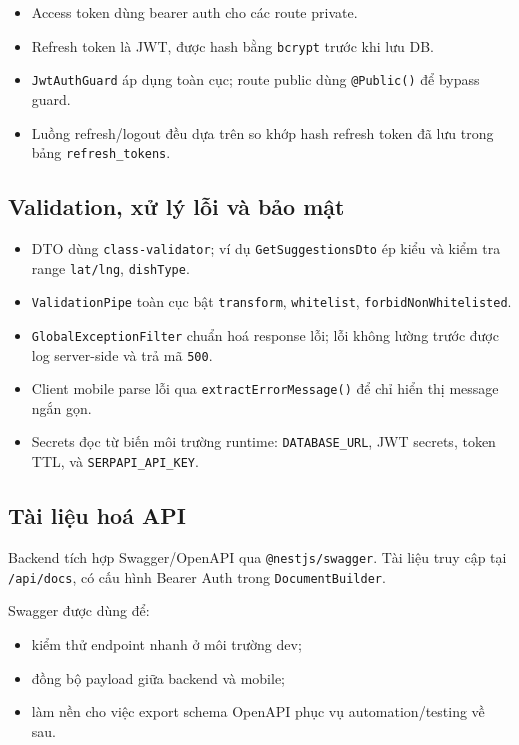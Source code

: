 \begin{itemize}
  \item Access token dùng bearer auth cho các route private.
  \item Refresh token là JWT, được hash bằng \texttt{bcrypt} trước khi lưu DB.
  \item \texttt{JwtAuthGuard} áp dụng toàn cục; route public dùng \texttt{@Public()} để bypass guard.
  \item Luồng refresh/logout đều dựa trên so khớp hash refresh token đã lưu trong bảng \texttt{refresh\_tokens}.
\end{itemize}

\subsection{Validation, xử lý lỗi và bảo mật}

\begin{itemize}
  \item DTO dùng \texttt{class-validator}; ví dụ \texttt{GetSuggestionsDto} ép kiểu và kiểm tra range \texttt{lat/lng}, \texttt{dishType}.
  \item \texttt{ValidationPipe} toàn cục bật \texttt{transform}, \texttt{whitelist}, \texttt{forbidNonWhitelisted}.
  \item \texttt{GlobalExceptionFilter} chuẩn hoá response lỗi; lỗi không lường trước được log server-side và trả mã \texttt{500}.
  \item Client mobile parse lỗi qua \texttt{extractErrorMessage()} để chỉ hiển thị message ngắn gọn.
  \item Secrets đọc từ biến môi trường runtime: \texttt{DATABASE\_URL}, JWT secrets, token TTL, và \texttt{SERPAPI\_API\_KEY}.
\end{itemize}

\subsection{Tài liệu hoá API}

Backend tích hợp Swagger/OpenAPI qua \texttt{@nestjs/swagger}. Tài liệu truy cập tại \texttt{/api/docs}, có cấu hình Bearer Auth trong \texttt{DocumentBuilder}.

Swagger được dùng để:
\begin{itemize}
  \item kiểm thử endpoint nhanh ở môi trường dev;
  \item đồng bộ payload giữa backend và mobile;
  \item làm nền cho việc export schema OpenAPI phục vụ automation/testing về sau.
\end{itemize}
